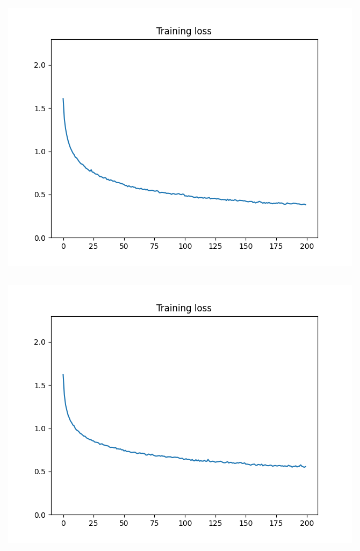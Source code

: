 \documentclass[12pt]{article}
\begin{document}
\begin{figure}
  \begin{subfigure}{0.24\textwidth}
    \centering
    \includegraphics[width=\linewidth]{loss_4_noaug.png}
    \caption{}
    \label{fig:4_noaug}
  \end{subfigure}
  \begin{subfigure}{0.24\textwidth}
    \centering
    \includegraphics[width=\linewidth]{loss_4_aug.png}
    \caption{}
    \label{fig:4_aug}
  \end{subfigure}
  \begin{subfigure}{0.24\textwidth}
    \centering

\end{subfigure}
\end{figure}
\end{document}
